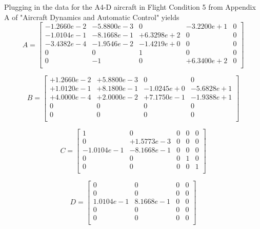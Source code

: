 \documentclass[12pt]{article}
\begin{document}
\noindent Plugging in the data for the A4-D aircraft in Flight Condition 5 from Appendix A of "Aircraft Dynamics and Automatic Control" yields
\begin{equation*}
A =
\begin{bmatrix}
  -1.2660e-2 & -5.8800e-3 &          0 & -3.2200e+1  &          0 \\
  -1.0104e-1 & -8.1668e-1 & +6.3298e+2 &          0  &          0 \\
  -3.4382e-4 & -1.9546e-2 & -1.4219e+0 &          0  &          0 \\
           0 &          0 &          1 &          0  &          0 \\
           0 &         -1 &          0 & +6.3400e+2  &          0 \\
\end{bmatrix}
\end{equation*}

\begin{equation*}
B =
\begin{bmatrix}
+1.2660e-2 & +5.8800e-3 &          0 &          0 \\
+1.0120e-1 & +8.1800e-1 & -1.0245e+0 & -5.6828e+1 \\
+4.0000e-4 & +2.0000e-2 & +7.1750e-1 & -1.9388e+1 \\
         0 &          0 &          0 &          0 \\
         0 &          0 &          0 &          0 \\
\end{bmatrix}
\end{equation*}

\begin{equation*}
C =
\begin{bmatrix}
           1 &          0 & 0 & 0 & 0 \\
           0 & +1.5773e-3 & 0 & 0 & 0 \\
  -1.0104e-1 & -8.1668e-1 & 0 & 0 & 0 \\
           0 &          0 & 0 & 1 & 0 \\
           0 &          0 & 0 & 0 & 1 \\
\end{bmatrix}
\end{equation*}

\begin{equation*}
D =
\begin{bmatrix}
           0 &         0 & 0 & 0 \\
           0 &         0 & 0 & 0 \\
   1.0104e-1 & 8.1668e-1 & 0 & 0 \\
           0 &         0 & 0 & 0 \\
           0 &         0 & 0 & 0 \\
\end{bmatrix}
\end{equation*}
\end{document}
